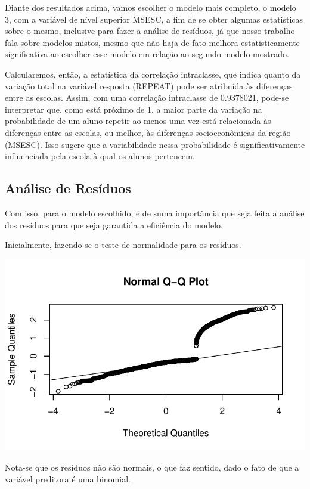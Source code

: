 \documentclass[
  letterpaper,
  DIV=11,
  numbers=noendperiod]{scrartcl}
\begin{document}
Diante dos resultados acima, vamos escolher o modelo mais completo, o
modelo 3, com a variável de nível superior MSESC, a fim de se obter
algumas estatisticas sobre o mesmo, inclusive para fazer a análise de
resíduos, já que nosso trabalho fala sobre modelos mistos, mesmo que não
haja de fato melhora estatisticamente significativa ao escolher esse
modelo em relação ao segundo modelo mostrado.

Calcularemos, então, a estatística da correlação intraclasse, que indica
quanto da variação total na variável resposta (REPEAT) pode ser
atribuída às diferenças entre as escolas. Assim, com uma correlação
intraclasse de 0.9378021, pode-se interpretar que, como está próximo de
1, a maior parte da variação na probabilidade de um aluno repetir ao
menos uma vez está relacionada às diferenças entre as escolas, ou
melhor, às diferenças socioeconômicas da região (MSESC). Isso sugere que
a variabilidade nessa probabilidade é significativamente influenciada
pela escola à qual os alunos pertencem.

\hypertarget{anuxe1lise-de-resuxedduos}{%
\subsection{Análise de Resíduos}\label{anuxe1lise-de-resuxedduos}}

Com isso, para o modelo escolhido, é de suma importância que seja feita
a análise dos resíduos para que seja garantida a eficiência do modelo.

Inicialmente, fazendo-se o teste de normalidade para os resíduos.

\includegraphics{trabalho-final_files/figure-pdf/unnamed-chunk-8-1.pdf}

Nota-se que os resíduos não são normais, o que faz sentido, dado o fato
de que a variável preditora é uma binomial.
\end{document}
